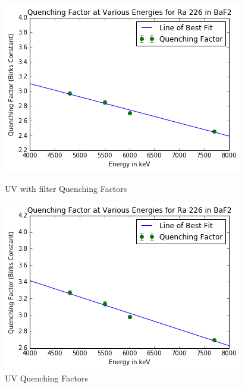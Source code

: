 \documentclass{article}
\begin{document}
\begin{figure}[H]
  \centering
  \begin{minipage}[b]{0.4\textwidth}
    \includegraphics[width=\textwidth]{qff.png}
    \caption{UV with filter Quenching Factors}
  \end{minipage}
  \hfill
  \begin{minipage}[b]{0.4\textwidth}
    \includegraphics[width=\textwidth]{qfuv.png}
    \caption{UV Quenching Factors}
  \end{minipage}
\end{figure}
 
\end{document}

